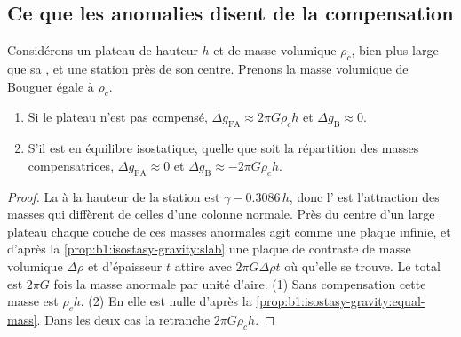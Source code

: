 \subsection*{Ce que les anomalies disent de la compensation}

\begin{proposition}\label{prop:b1:isostasy-gravity:broad}
Considérons un plateau de hauteur $h$ et de masse volumique $\rho_c$, bien plus large
que sa , et une station près de son centre. Prenons la
masse volumique de Bouguer égale à $\rho_c$.
\begin{enumerate}
  \item Si le plateau n'est pas compensé, $\Delta g_{\mathrm{FA}} \approx
        2\pi G\rho_c h$ et $\Delta g_{\mathrm B} \approx 0$.
  \item S'il est en équilibre isostatique, quelle que soit la répartition des
        masses compensatrices, $\Delta g_{\mathrm{FA}} \approx 0$ et
        $\Delta g_{\mathrm B} \approx -2\pi G\rho_c h$.
\end{enumerate}
\end{proposition}

\begin{proof}
La  à la hauteur de la station est $\gamma - 0.3086\,h$, donc l' est l'attraction des masses qui diffèrent de celles d'une colonne
normale. Près du centre d'un large plateau chaque couche de ces masses anormales
agit comme une plaque infinie, et d'après la \cref{prop:b1:isostasy-gravity:slab} une
plaque de contraste de masse volumique $\Delta\rho$ et d'épaisseur $t$ attire avec $2\pi G\Delta\rho
t$ où qu'elle se trouve. Le total est $2\pi G$ fois la masse anormale par unité
d'aire. (1) Sans compensation cette masse est $\rho_c h$. (2) En  elle est
nulle d'après la \cref{prop:b1:isostasy-gravity:equal-mass}. Dans les deux cas la
 retranche $2\pi G\rho_c h$.
\end{proof}

